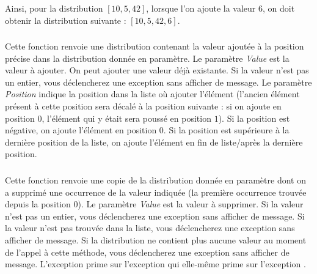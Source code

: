 \medskip

\noindent Ainsi, pour la distribution $ [ 10, 5, 42 ] $, lorsque l'on ajoute la valeur $ 6 $, on doit obtenir la distribution suivante : $ [ 10, 5, 42, 6 ] $.


\subsubsection*{}

\noindent Cette fonction renvoie une distribution contenant la valeur ajoutée à la position précise dans la distribution donnée en paramètre.
Le paramètre \textit{Value} est la valeur à ajouter.
On peut ajouter une valeur déjà existante.
Si la valeur n'est pas un entier, vous déclencherez une exception  sans afficher de message.
Le paramètre \textit{Position} indique la position dans la liste où ajouter l'élément (l'ancien élément présent à cette position sera décalé à la position suivante : si on ajoute en position $ 0 $, l'élément qui y était sera poussé en position $ 1 $).
Si la position est négative, on ajoute l'élément en position $ 0 $.
Si la position est supérieure à la dernière position de la liste, on ajoute l'élément en fin de liste/après la dernière position.


\subsubsection*{}

\noindent Cette fonction renvoie une copie de la distribution donnée en paramètre dont on a supprimé une occurrence de la valeur indiquée (la première occurrence trouvée depuis la position $ 0 $).
Le paramètre \textit{Value} est la valeur à supprimer.
Si la valeur n'est pas un entier, vous déclencherez une exception  sans afficher de message.
Si la valeur n'est pas trouvée dans la liste, vous déclencherez une exception  sans afficher de message.
Si la distribution ne contient plus aucune valeur au moment de l'appel à cette méthode, vous déclencherez une exception  sans afficher de message.
L'exception  prime sur l'exception  qui elle-même prime sur l'exception .


\subsubsection*{}

